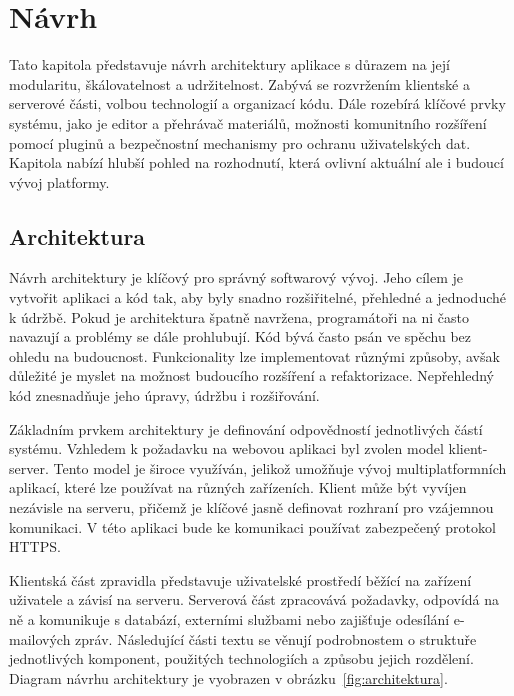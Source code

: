 \chapter{Návrh}\label{text:navrh}

\begin{chapterabstract}
Tato kapitola představuje návrh architektury aplikace s důrazem na její modularitu, škálovatelnost a udržitelnost. 
Zabývá se rozvržením klientské a serverové části, volbou technologií a organizací kódu. 
Dále rozebírá klíčové prvky systému, jako je editor a přehrávač materiálů, možnosti komunitního rozšíření pomocí pluginů a bezpečnostní mechanismy pro ochranu uživatelských dat. 
Kapitola nabízí hlubší pohled na rozhodnutí, která ovlivní aktuální ale i budoucí vývoj platformy.
\end{chapterabstract}

\section{Architektura}

Návrh architektury je klíčový pro správný softwarový vývoj. 
Jeho cílem je vytvořit aplikaci a kód tak, aby byly snadno rozšiřitelné, přehledné a jednoduché k údržbě. 
Pokud je architektura špatně navržena, programátoři na ni často navazují a problémy se dále prohlubují.
Kód bývá často psán ve spěchu bez ohledu na budoucnost. 
Funkcionality lze implementovat různými způsoby, avšak důležité je myslet na možnost budoucího rozšíření a refaktorizace. 
Nepřehledný kód znesnadňuje jeho úpravy, údržbu i rozšiřování.

Základním prvkem architektury je definování odpovědností jednotlivých částí systému. 
Vzhledem k požadavku na webovou aplikaci byl zvolen model klient-server. 
Tento model je široce využíván, jelikož umožňuje vývoj multiplatformních aplikací, které lze používat na různých zařízeních. 
Klient může být vyvíjen nezávisle na serveru, přičemž je klíčové jasně definovat rozhraní pro vzájemnou komunikaci. 
V této aplikaci bude ke komunikaci používat zabezpečený protokol HTTPS.

Klientská část zpravidla představuje uživatelské prostředí běžící na zařízení uživatele a závisí na serveru. 
Serverová část zpracovává požadavky, odpovídá na ně a komunikuje s databází, externími službami nebo zajišťuje odesílání e-mailových zpráv. 
Následující části textu se věnují podrobnostem o struktuře jednotlivých komponent, použitých technologiích a způsobu jejich rozdělení. 
Diagram návrhu architektury je vyobrazen v obrázku~\ref{fig:architektura}.

